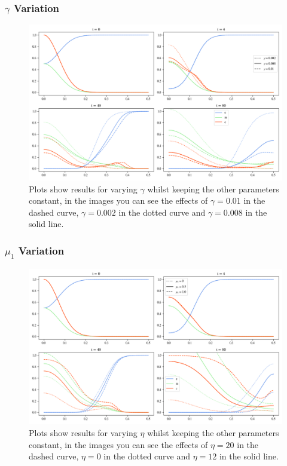 \subsubsection*{$\gamma$ Variation}

\begin{figure}[h]
    \centering
    \includegraphics[width=\textwidth]{resources/images/prolif_gamma_variation.png}
    \caption{Plots show results for varying $\gamma$ whilst keeping the other parameters constant, in the images you can see the effects of $\gamma=0.01$ in the dashed curve, $\gamma=0.002$ in the dotted curve and $\gamma=0.008$ in the solid line.}
    \label{fig:gamma_variation}
\end{figure}


\subsubsection*{$\mu_1$ Variation}
\begin{figure}[h]
    \centering
    \includegraphics[width=\textwidth]{resources/images/prolif_mu_1_variation.png}
    \caption{Plots show results for varying $\eta$ whilst keeping the other parameters constant, in the images you can see the effects of $\eta=20$ in the dashed curve, $\eta=0$ in the dotted curve and $\eta=12$ in the solid line.}
    \label{fig:eta_variation}
\end{figure}


